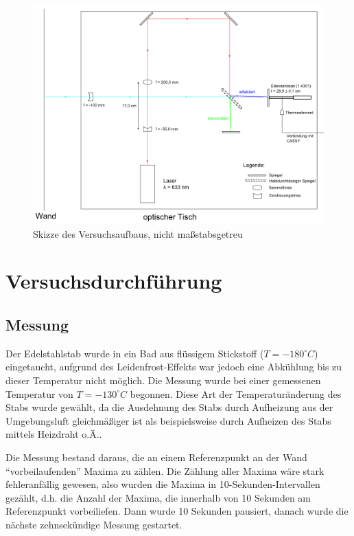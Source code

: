 \begin{landscape}
\begin{figure}
\includegraphics[height=\textwidth]{images/bitmap.png}
\caption{Skizze des Versuchsaufbaus, nicht maßstabsgetreu} 
\label{pic:skizze_versuchsaufbau}
\end{figure}
\end{landscape}

\section{Versuchsdurchführung}
\subsection{Messung}
Der Edelstahlstab wurde in ein Bad aus flüssigem Stickstoff ($T=-180^{\circ}C$) eingetaucht, aufgrund des Leidenfrost-Effekts war jedoch eine Abkühlung bis zu dieser Temperatur nicht möglich. Die Messung wurde bei einer gemessenen Temperatur von $T=-130^{\circ}C$ begonnen. Diese Art der Temperaturänderung des Stabs wurde gewählt, da die Ausdehnung des Stabs durch Aufheizung aus der Umgebungsluft gleichmäßiger ist als beispielsweise durch Aufheizen des Stabs mittels Heizdraht o.Ä..

Die Messung bestand daraus, die an einem Referenzpunkt an der Wand \enquote{vorbeilaufenden} Maxima zu zählen. Die Zählung aller Maxima wäre stark fehleranfällig gewesen, also wurden die Maxima in 10-Sekunden-Intervallen gezählt, d.h. die Anzahl der Maxima, die innerhalb von 10 Sekunden am Referenzpunkt vorbeiliefen.  Dann wurde 10 Sekunden pausiert, danach wurde die nächste zehnsekündige Messung gestartet. 

